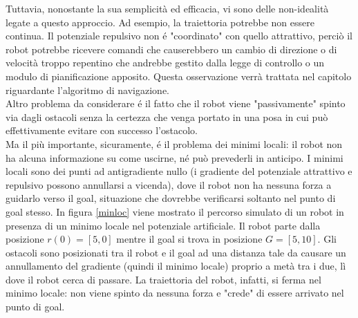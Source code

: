 \documentclass[14pt,a4paper]{extarticle}
\begin{document}
Tuttavia, nonostante la sua semplicità ed efficacia, vi sono delle non-idealità legate a questo approccio. Ad esempio, la traiettoria potrebbe non essere continua. Il potenziale repulsivo non é "coordinato" con quello attrattivo, perciò il robot potrebbe ricevere comandi che causerebbero un cambio di direzione o di velocità troppo repentino che andrebbe gestito dalla legge di controllo o un modulo di pianificazione apposito. Questa osservazione verrà trattata nel capitolo riguardante l'algoritmo di navigazione. \\
Altro problema da considerare é il fatto che il robot viene "passivamente" spinto via dagli ostacoli senza la certezza che venga portato in una posa in cui può effettivamente evitare con successo l'ostacolo.\\
Ma il più importante, sicuramente, é il problema dei minimi locali: il robot non ha alcuna informazione su come uscirne, né può prevederli in anticipo. I minimi locali sono dei punti ad antigradiente nullo (i gradiente del potenziale attrattivo e repulsivo possono annullarsi a vicenda), dove il robot non ha nessuna forza a guidarlo verso il goal, situazione che dovrebbe verificarsi soltanto nel punto di goal stesso. In figura \ref{minloc} viene mostrato il percorso simulato di un robot in presenza di un minimo locale nel potenziale artificiale. Il robot parte dalla posizione \(r(0) = [5,0]\) mentre il goal si trova in posizione \(G = [5,10]\). Gli ostacoli sono posizionati tra il robot e il goal ad una distanza tale da causare un annullamento del gradiente (quindi il minimo locale) proprio a metà tra i due, lì dove il robot cerca di passare. La traiettoria del robot, infatti, si ferma nel minimo locale: non viene spinto da nessuna forza e "crede" di essere arrivato nel punto di goal.
\end{document}
